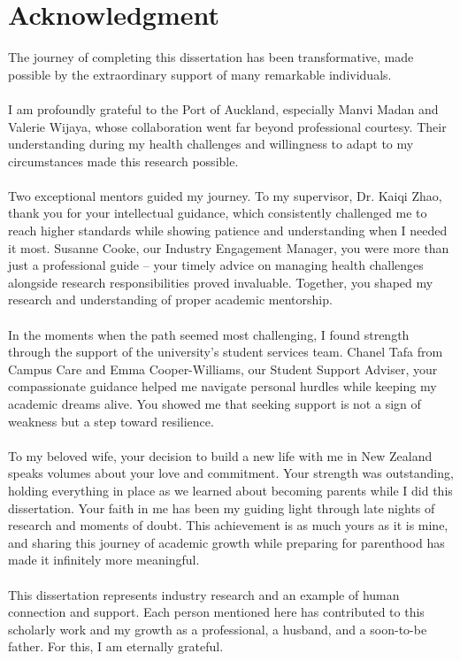 \chapter*{Acknowledgment}

	The journey of completing this dissertation has been transformative, made possible by the extraordinary support of
	many remarkable individuals.
	\\
	\\
	I am profoundly grateful to the Port of Auckland, especially Manvi Madan and Valerie Wijaya, whose collaboration
	went far beyond professional courtesy. Their understanding during my health challenges and willingness to adapt to
	my circumstances made this research possible.
	\\
	\\
	Two exceptional mentors guided my journey. To my supervisor, Dr. Kaiqi Zhao, thank you for your intellectual
	guidance, which consistently challenged me to reach higher standards while showing patience and understanding
	when I needed it most. Susanne Cooke, our Industry Engagement Manager, you were more than just a professional guide
	– your timely advice on managing health challenges alongside research responsibilities proved invaluable. Together,
	you shaped my research and understanding of proper academic mentorship.
	\\
	\\
	In the moments when the path seemed most challenging, I found strength through the support of the university's
	student services team. Chanel Tafa from Campus Care and Emma Cooper-Williams, our Student Support Adviser, your
	compassionate guidance helped me navigate personal hurdles while keeping my academic dreams alive. You showed me
	that seeking support is not a sign of weakness but a step toward resilience.
	\\
	\\
	To my beloved wife, your decision to build a new life with me in New Zealand speaks volumes about your love and
	commitment. Your strength was outstanding, holding everything in place as we learned about becoming parents while I
	did this dissertation. Your faith in me has been my guiding light through late nights of research and moments of
	doubt. This achievement is as much yours as it is mine, and sharing this journey of academic growth while preparing
	for parenthood has made it infinitely more meaningful.
	\\
	\\
	This dissertation represents industry research and an example of human connection and support. Each person
	mentioned here has contributed to this scholarly work and my growth as a professional, a husband, and a soon-to-be
	father. For this, I am eternally grateful.